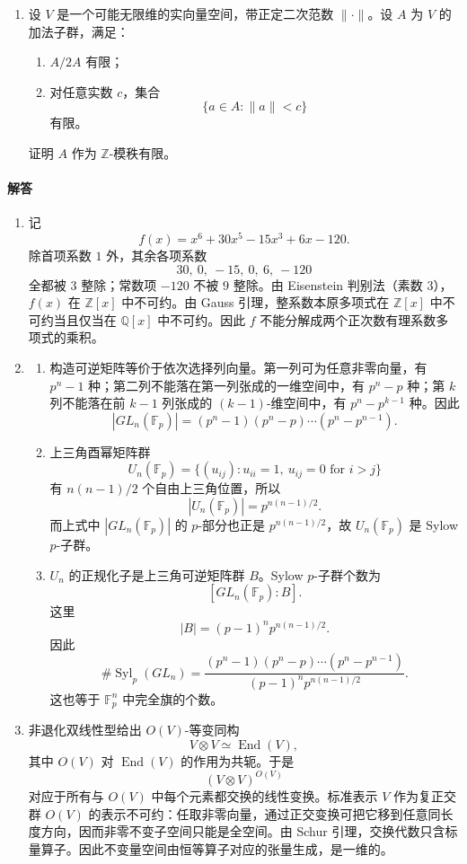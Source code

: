 \documentclass[UTF8,12pt]{ctexart}
\begin{document}
\begin{enumerate}[label=\textbf{\arabic*.},leftmargin=2.2em]
\item 设 \(V\) 是一个可能无限维的实向量空间，带正定二次范数 \(\|\cdot\|\)。设 \(A\) 为 \(V\) 的加法子群，满足：
\begin{enumerate}[label=\textbf{(\arabic*)},leftmargin=2.4em]
\item \(A/2A\) 有限；
\item 对任意实数 \(c\)，集合
\[
\{a\in A:\|a\|<c\}
\]
有限。
\end{enumerate}
证明 \(A\) 作为 \(\mathbb Z\)-模秩有限。
\end{enumerate}

\paragraph{解答}
\begin{enumerate}[label=\textbf{\arabic*.},leftmargin=2.2em]
\item 记
\[
f(x)=x^6+30x^5-15x^3+6x-120.
\]
除首项系数 \(1\) 外，其余各项系数
\[
30,\ 0,\ -15,\ 0,\ 6,\ -120
\]
全都被 \(3\) 整除；常数项 \(-120\) 不被 \(9\) 整除。由 Eisenstein 判别法（素数 \(3\)），\(f(x)\) 在 \(\mathbb Z[x]\) 中不可约。由 Gauss 引理，整系数本原多项式在 \(\mathbb Z[x]\) 中不可约当且仅当在 \(\mathbb Q[x]\) 中不可约。因此 \(f\) 不能分解成两个正次数有理系数多项式的乘积。

\item
\begin{enumerate}[label=\textbf{(\arabic*)},leftmargin=2.4em]
\item 构造可逆矩阵等价于依次选择列向量。第一列可为任意非零向量，有 \(p^n-1\) 种；第二列不能落在第一列张成的一维空间中，有 \(p^n-p\) 种；第 \(k\) 列不能落在前 \(k-1\) 列张成的 \((k-1)\)-维空间中，有 \(p^n-p^{k-1}\) 种。因此
\[
|GL_n(\mathbb F_p)|=(p^n-1)(p^n-p)\cdots(p^n-p^{n-1}).
\]
\item 上三角酉幂矩阵群
\[
U_n(\mathbb F_p)=
\{(u_{ij}):u_{ii}=1,\ u_{ij}=0\text{ for }i>j\}
\]
有 \(n(n-1)/2\) 个自由上三角位置，所以
\[
|U_n(\mathbb F_p)|=p^{n(n-1)/2}.
\]
而上式中 \(|GL_n(\mathbb F_p)|\) 的 \(p\)-部分也正是 \(p^{n(n-1)/2}\)，故 \(U_n(\mathbb F_p)\) 是 Sylow \(p\)-子群。
\item \(U_n\) 的正规化子是上三角可逆矩阵群 \(B\)。Sylow \(p\)-子群个数为
\[
[GL_n(\mathbb F_p):B].
\]
这里
\[
|B|=(p-1)^n p^{n(n-1)/2}.
\]
因此
\[
\#\operatorname{Syl}_p(GL_n)
=\frac{(p^n-1)(p^n-p)\cdots(p^n-p^{n-1})}{(p-1)^n p^{n(n-1)/2}}.
\]
这也等于 \(\mathbb F_p^n\) 中完全旗的个数。
\end{enumerate}

\item 非退化双线性型给出 \(O(V)\)-等变同构
\[
V\otimes V\simeq \operatorname{End}(V),
\]
其中 \(O(V)\) 对 \(\operatorname{End}(V)\) 的作用为共轭。于是
\[
(V\otimes V)^{O(V)}
\]
对应于所有与 \(O(V)\) 中每个元素都交换的线性变换。标准表示 \(V\) 作为复正交群 \(O(V)\) 的表示不可约：任取非零向量，通过正交变换可把它移到任意同长度方向，因而非零不变子空间只能是全空间。由 Schur 引理，交换代数只含标量算子。因此不变量空间由恒等算子对应的张量生成，是一维的。


\end{enumerate}
\end{document}
